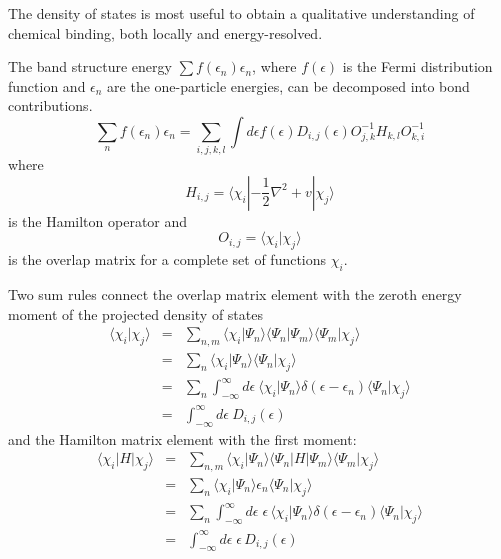 \documentclass[final,12pt]{article}
\begin{document}
{{{{{{The density of states is most useful to obtain a qualitative
understanding of chemical binding, both locally and energy-resolved.

The band structure energy $\sum f(\epsilon_n)\epsilon_n$, where
$f(\epsilon)$ is the Fermi distribution function and $\epsilon_n$ are
the one-particle energies, can be decomposed into bond
contributions. 
\begin{equation}
\sum_n f(\epsilon_n)\epsilon_n 
= \sum_{i,j,k,l} \int d\epsilon f(\epsilon)
D_{i,j}(\epsilon) O^{-1}_{j,k} H_{k,l}O^{-1}_{k,i}
\label{eq:dosebandeq1}
\end{equation}
where 
\begin{equation}
H_{i,j}=\langle\chi_i|-\frac{1}{2}\nabla^2+v|\chi_j\rangle
\end{equation}
is the Hamilton operator and 
\begin{equation}
O_{i,j}=\langle\chi_i|\chi_j\rangle
\end{equation}
is the overlap matrix for a complete set of functions $\chi_i$.

Two sum rules connect the overlap matrix element
with the zeroth energy moment of the projected density of states
\begin{eqnarray}
\langle\chi_i|\chi_j\rangle&=&\sum_{n,m}
\langle\chi_i|\Psi_n\rangle\langle\Psi_n|\Psi_m\rangle\langle\Psi_m|\chi_j\rangle
\nonumber\\
&=&\sum_{n}\langle\chi_i|\Psi_n\rangle   \langle\Psi_n|\chi_j\rangle
\nonumber\\
&=&\sum_{n}\int_{-\infty}^{\infty} d\epsilon\ 
\langle\chi_i|\Psi_n\rangle\delta(\epsilon-\epsilon_n)
\langle\Psi_n|\chi_j\rangle
\nonumber\\
&=&\int_{-\infty}^{\infty} d\epsilon\  D_{i,j}(\epsilon)
\label{eq:dossumruleo}
\end{eqnarray}
and the Hamilton matrix element with the first moment:
\begin{eqnarray}
\langle\chi_i|H|\chi_j\rangle&=&\sum_{n,m}
\langle\chi_i|\Psi_n\rangle\langle\Psi_n|H|\Psi_m\rangle\langle\Psi_m|\chi_j\rangle
\nonumber\\
&=&\sum_{n}\langle\chi_i|\Psi_n\rangle  \epsilon_n \langle\Psi_n|\chi_j\rangle
\nonumber\\
&=&\sum_{n}\int_{-\infty}^{\infty} d\epsilon\;\epsilon\,
\langle\chi_i|\Psi_n\rangle\delta(\epsilon-\epsilon_n)
\langle\Psi_n|\chi_j\rangle
\nonumber\\
&=&\int_{-\infty}^{\infty} d\epsilon\;\epsilon\, D_{i,j}(\epsilon)
\label{eq:dossumruleh}
\end{eqnarray}

}}}}}}
\end{document}
